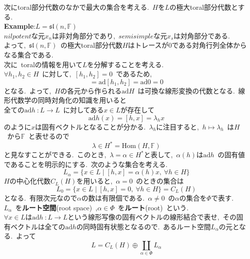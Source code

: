 \documentclass[uplatex,dvipdfmx]{jsarticle}
\begin{document}
次にtoral部分代数のなかで最大の集合を考える.~$H$を$L$の極大toral部分代数とする.\\
\textbf{Example}:$L = \mathfrak{sl}(n,\mathbb{F})$\\
$nilpotent$な元$x_n$は非対角部分であり,~$semisimple$な元$x_s$は対角部分である.~\\
よって,~$\mathfrak{sl}(n,\mathbb{F})$~の極大toral部分代数$H$はトレースが$0$である対角行列全体からなる集合である.\\
次に~toralの情報を用いて$L$を分解することを考える.\\
$\forall h_1,h_2\in H$~に対して,~$[h_1,h_2] = 0$~であるため,
\begin{equation*}
    [\text{ad}h_1, \text{ad}h_2] = \text{ad} [h_1,h_2] = \text{ad}0 = 0
\end{equation*}
となる.~よって,~$H$の各元から作られる$\text{ad}H$~は可換な線形変換の代数となる.~線形代数学の同時対角化の知識を用いると\\
全ての$\text{ad}h~:L\to L$~に対してある$x\in L$が存在して
\begin{equation*}
    \text{ad}h(x) = [h,x] = \lambda_h x
\end{equation*}
のように$x$は固有ベクトルとなることが分かる.~$\lambda_h$に注目すると,~$h \mapsto \lambda_h$~は$H$~から$\mathbb{F}$~と表せるので
\begin{equation*}
    \lambda \in H^* = \text{Hom}(H,\mathbb{F})
\end{equation*}
と見なすことができる.~このとき,~$\lambda = \alpha \in H^*$と表して,~$\alpha(h)$は$\text{ad}h$~の固有値であることを明示的にする.~次のような集合を考える.
\begin{equation*}
    L_\alpha = \{ x \in L \mid [h,x] = \alpha(h)x,~\forall h \in H \}
\end{equation*}
$H$の中心化代数$C_L(H)$を用いると,~$\alpha = 0$~のときの集合は
\begin{equation*}
    L_0 = \{ x \in L \mid [h,x] = 0,~\forall h \in H \} = C_L(H)
\end{equation*}
となる.~有限次元なので$\alpha$の数は有限個である.~$\alpha \neq 0$~の$\alpha$の集合を$\Phi$で表す.\\
$L_\alpha$~を\textbf{ルート空間}(root space)~,$\alpha \in \Phi$~を\textbf{ルート}(root)~という.\\
$\forall x \in L$は$\text{ad}h~:L\to L$という線形写像の固有ベクトルの線形結合で表せ,~その固有ベクトルは全ての$\text{ad} h$の同時固有状態となるので.~あるルート空間$L_\alpha$の元となる.~よって
\begin{equation*}
    L = C_L(H) \oplus \coprod_{\alpha \in \Phi} L_\alpha
\end{equation*}
\end{document}

